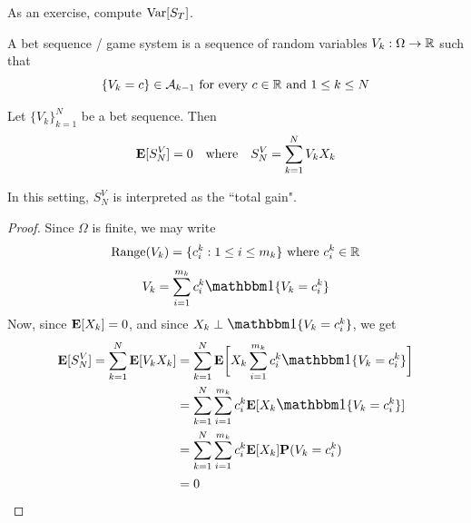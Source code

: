 \documentclass[main]{subfiles}
\begin{document}
As an exercise, compute $ {\operatorname{Var}}[S_T] $.\\

\begin{definition}
    A bet sequence / game system is a sequence of random variables $ V_k:\Omega\to\mathbb R $ such that
    \[\{V_k=c\}\in\mathcal A_{k-1}\text{ for every }c\in\mathbb R\text{ and }1\le k\le N\]
\end{definition}

\begin{theorem}
    Let $ \{V_k\}_{k=1}^N $ be a bet sequence. Then
    \[\mathbf E[S_N^V]=0\text{\quad where\quad}S_N^V=\sum_{k=1}^NV_kX_k\]
\end{theorem}

In this setting, $ S_N^V $ is interpreted as the ``total gain".

\begin{proof}
    Since $ \Omega $ is finite, we may write
    \[\text{Range}(V_k)=\{c_i^k:1\le i\le m_k\}\text{ where }c_i^k\in\mathbb R\]
    \[V_k=\sum_{i=1}^{m_k}c_i^k\one\{V_k=c_i^k\}\]
    Now, since $ \mathbf E[X_k]=0 $, and since $ X_k\perp\mathlarger{\one}\{V_k=c_i^k\} $, we get
    \begin{align*}
        \E[S_N^V]=\sum_{k=1}^N\E[V_kX_k] & =\sum_{k=1}^N\E\bigg[X_k\sum_{i=1}^{m_k}c_i^k\one\{V_k=c_i^k\}\bigg] \\
                                         & = \sum_{k=1}^N\sum_{i=1}^{m_k}c_i^k\E[X_k\one\{V_k=c_i^k\}]          \\
                                         & = \sum_{k=1}^N\sum_{i=1}^{m_k}c_i^k\E[X_k]\P(V_k=c_i^k)              \\
                                         & = 0
    \end{align*}
\end{proof}
\end{document}
